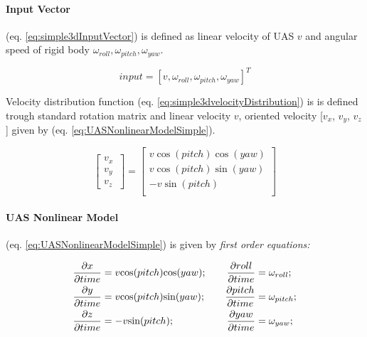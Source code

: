 \paragraph{Input Vector} (eq. \ref{eq:simple3dInputVector}) is defined as linear velocity of UAS $v$ and angular speed of rigid body $\omega_{roll}, \omega_{pitch},\omega_{yaw}$.

\begin{equation}\label{eq:simple3dInputVector}
    input = \left [ v, \omega_{roll}, \omega_{pitch},\omega_{yaw}\right ]^T
\end{equation}


\noindent Velocity distribution function (eq. \ref{eq:simple3dvelocityDistribution})  is is defined trough standard rotation matrix  and linear velocity $v$, oriented velocity [$v_x$, $v_y$, $v_z$] given by (eq. \ref{eq:UASNonlinearModelSimple}).

\begin{equation}\label{eq:simple3dvelocityDistribution}
    \begin{bmatrix}
    v_x\\
    v_y\\
    v_z\
    \end{bmatrix}
    =
    \begin{bmatrix}
         v\cos(pitch)\cos(yaw)\\
         v\cos(pitch)\sin(yaw)\\
         -v\sin(pitch)\\
    \end{bmatrix}
\end{equation}

\paragraph{UAS Nonlinear Model} (eq. \ref{eq:UASNonlinearModelSimple}) is given by \emph{first order equations:}

\begin{equation}\label{eq:UASNonlinearModelSimple}
    \begin{aligned}
        \frac{\partial x}{\partial time} &= v\cos(pitch)\cos(yaw);\\
        \frac{\partial y}{\partial time} &= v\cos(pitch)\sin(yaw);\\
        \frac{\partial z}{\partial time} &= -v\sin(pitch);\\
    \end{aligned}\\\quad\quad
    \begin{aligned}
        \frac{\partial roll}{\partial time} &= \omega_{roll};\\
        \frac{\partial pitch}{\partial time} &= \omega_{pitch};\\
        \frac{\partial yaw}{\partial time} &= \omega_{yaw};\\
    \end{aligned}
\end{equation}


